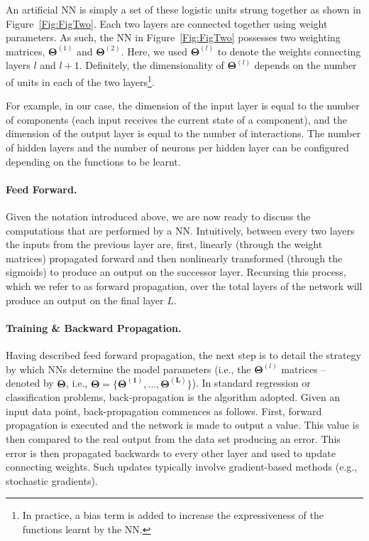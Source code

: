 An artificial NN is simply a set of these logistic units strung together as shown in Figure~\ref{Fig:FigTwo}. Each two layers are connected together using weight parameters. As such, the NN in Figure~\ref{Fig:FigTwo} possesses two weighting matrices, $\bm{\Theta}^{(1)}$ and $\bm{\Theta}^{(2)}$. Here, we used $\bm{\Theta}^{(l)}$ to denote the weights connecting layers $l$ and $l+1$. Definitely, the dimensionality of $\bm{\Theta}^{(l)}$ depends on the number of units in each of the two layers\footnote{
In practice, a bias term is added to increase the expressiveness of the functions learnt by the NN.}. 

For example, in our case, the dimension of the input layer is equal to the number of components (each input receives the current state of a component), and the dimension of the output layer is equal to the number of interactions. 
The number of hidden layers and the number of neurons per hidden layer can be configured depending on the functions to be learnt. 
%

\paragraph{Feed Forward.}
Given the notation introduced above, we are now ready to discuss the computations that are performed by a NN. Intuitively, between every two layers the inputs from the previous layer are, first, linearly (through the weight matrices) propagated forward and then nonlinearly transformed (through the sigmoids) to produce an output on the successor layer. Recursing this process, which we refer to as forward propagation, over the total layers of the network will produce an output on the final layer $L$. 
%

\paragraph{Training \& Backward Propagation.} Having described feed forward propagation, the next step is to detail the strategy by which NNs determine the model parameters (i.e., the $\bm{\Theta}^{(l)}$ matrices -- denoted by $\bm{\Theta}$, i.e., $\bm{\Theta} = \{\bm{\Theta^{(1)}}, \dots, \bm{\Theta^{(L)}}\}$). In standard regression or classification problems, back-propagation is the algorithm adopted. Given an input data point, back-propagation commences as follows. First, forward propagation is executed and the network is made to output a value. This value is then compared to the real output from the data set producing an error. This error is then propagated backwards to every other layer and used to update connecting weights. Such updates typically involve gradient-based methods (e.g., stochastic gradients). 
